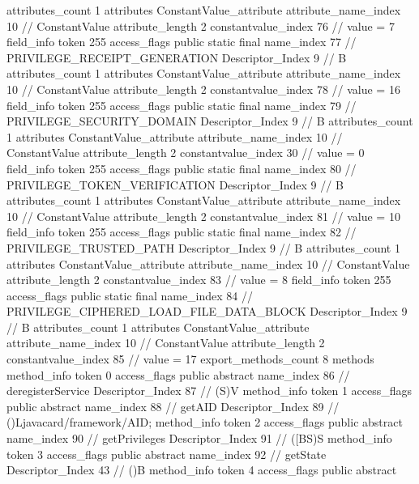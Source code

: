 {{{{{				attributes_count	1
				attributes {
				ConstantValue_attribute {
					attribute_name_index	10		// ConstantValue
					attribute_length	2
					constantvalue_index	76		// value = 7
				}
				}
			}
			field_info {
				token	255
				access_flags	public static final
				name_index	77		// PRIVILEGE_RECEIPT_GENERATION
				Descriptor_Index	9		// B
				attributes_count	1
				attributes {
				ConstantValue_attribute {
					attribute_name_index	10		// ConstantValue
					attribute_length	2
					constantvalue_index	78		// value = 16
				}
				}
			}
			field_info {
				token	255
				access_flags	public static final
				name_index	79		// PRIVILEGE_SECURITY_DOMAIN
				Descriptor_Index	9		// B
				attributes_count	1
				attributes {
				ConstantValue_attribute {
					attribute_name_index	10		// ConstantValue
					attribute_length	2
					constantvalue_index	30		// value = 0
				}
				}
			}
			field_info {
				token	255
				access_flags	public static final
				name_index	80		// PRIVILEGE_TOKEN_VERIFICATION
				Descriptor_Index	9		// B
				attributes_count	1
				attributes {
				ConstantValue_attribute {
					attribute_name_index	10		// ConstantValue
					attribute_length	2
					constantvalue_index	81		// value = 10
				}
				}
			}
			field_info {
				token	255
				access_flags	public static final
				name_index	82		// PRIVILEGE_TRUSTED_PATH
				Descriptor_Index	9		// B
				attributes_count	1
				attributes {
				ConstantValue_attribute {
					attribute_name_index	10		// ConstantValue
					attribute_length	2
					constantvalue_index	83		// value = 8
				}
				}
			}
			field_info {
				token	255
				access_flags	public static final
				name_index	84		// PRIVILEGE_CIPHERED_LOAD_FILE_DATA_BLOCK
				Descriptor_Index	9		// B
				attributes_count	1
				attributes {
				ConstantValue_attribute {
					attribute_name_index	10		// ConstantValue
					attribute_length	2
					constantvalue_index	85		// value = 17
				}
				}
			}
			}
			export_methods_count	8
			methods {
				method_info {
					token	0
					access_flags	public abstract
					name_index	86		// deregisterService
					Descriptor_Index	87		// (S)V
				}
				method_info {
					token	1
					access_flags	public abstract
					name_index	88		// getAID
					Descriptor_Index	89		// ()Ljavacard/framework/AID;
				}
				method_info {
					token	2
					access_flags	public abstract
					name_index	90		// getPrivileges
					Descriptor_Index	91		// ([BS)S
				}
				method_info {
					token	3
					access_flags	public abstract
					name_index	92		// getState
					Descriptor_Index	43		// ()B
				}
				method_info {
					token	4
					access_flags	public abstract
}}}}}
